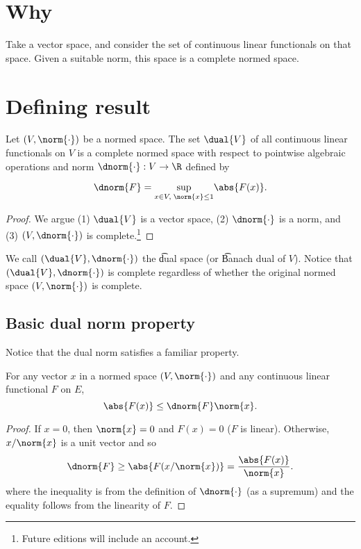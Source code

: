 

\section*{Why}

Take a vector space, and consider the set of continuous linear functionals on that space.
Given a suitable norm, this space is a complete normed space.

\section*{Defining result}

\begin{proposition}
Let $(V, \norm{\cdot })$ be a normed space.
The set $\dual{V}$ of all continuous linear functionals on $V$ is a complete normed space with respect to pointwise algebraic operations and norm $\dnorm{\cdot }: V \to \R $ defined by

  \[
\dnorm{F} = \underset{x \in V, \;\norm{x} \leq 1}{\sup} \abs{F(x)}.
  \]\end{proposition}
\begin{proof}We argue (1) $\dual{V}$ is a vector space, (2) $\dnorm{\cdot }$ is a norm, and (3) $(V, \dnorm{\cdot })$ is complete.\footnote{Future editions will include an account.}\end{proof}
We call $(\dual{V}, \dnorm{\cdot })$ the \t{dual space} (or \t{Banach dual of $V$}).
Notice that $(\dual{V}, \dnorm{\cdot })$ is complete regardless of whether the original normed space $(V,\norm{\cdot })$ is complete.

\subsection*{Basic dual norm property}

Notice that the dual norm satisfies a familiar property.

\begin{proposition}
For any vector $x$ in a normed space $(V, \norm{\cdot })$ and any continuous linear functional $F$ on $E$,
  \[
\abs{F(x)} \leq \dnorm{F}\norm{x}.
  \]\end{proposition}
\begin{proof}If $x = 0$, then $\norm{x} = 0$ and $F(x) = 0$ ($F$ is linear). Otherwise, $x/\norm{x}$ is a unit vector and so
  \[
\dnorm{F} \geq \abs{F(x/\norm{x})} = \frac{\abs{F(x)}}{\norm{x}}.
  \]
where the inequality is from the definition of $\dnorm{\cdot }$ (as a supremum) and the equality follows from the linearity of $F$.\end{proof}